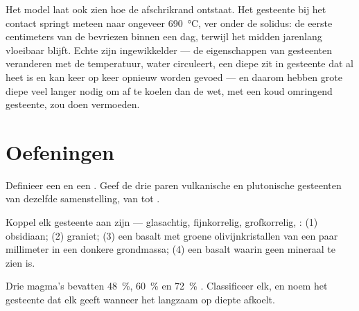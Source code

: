 Het model laat ook zien hoe de afschrikrand ontstaat. Het gesteente bij het contact
springt meteen naar ongeveer \qty{690}{\degreeCelsius}, ver onder de solidus: de
eerste centimeters van de  bevriezen binnen een dag, terwijl het midden jarenlang
vloeibaar blijft. Echte  zijn ingewikkelder --- de eigenschappen van
gesteenten veranderen met de temperatuur, water circuleert, een diepe  zit in gesteente
dat al heet is en kan keer op keer opnieuw worden gevoed --- en daarom hebben grote
diepe  veel langer nodig om af te koelen dan de wet, met een koud omringend gesteente,
zou doen vermoeden.

\section{Oefeningen}

\begin{exercise}[$\star$]\label{exo:g11:igneous-rocks:1}
Definieer een  en een . Geef de drie paren
vulkanische en plutonische gesteenten van dezelfde samenstelling, van  tot .
\end{exercise}

\begin{exercise}[$\star$]\label{exo:g11:igneous-rocks:2}
Koppel elk gesteente aan zijn  --- glasachtig, fijnkorrelig, grofkorrelig,
: (1) obsidiaan; (2) graniet; (3) een basalt met groene olivijnkristallen
van een paar millimeter in een donkere grondmassa; (4) een basalt waarin
geen mineraal te zien is.
\end{exercise}

\begin{exercise}[$\star$]\label{exo:g11:igneous-rocks:3}
Drie magma's bevatten \qty{48}{\percent}, \qty{60}{\percent} en
\qty{72}{\percent} . Classificeer elk, en noem het gesteente dat elk geeft
wanneer het langzaam op diepte afkoelt.
\end{exercise}

